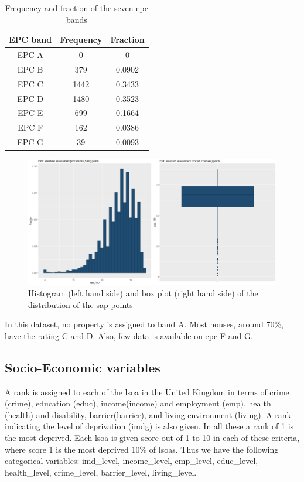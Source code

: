 \documentclass[12pt]{article}
\begin{document}
\begin{table}[H]
\centering
\begin{tabular}{c c c} 
 \hline
 EPC band & Frequency & Fraction \\ [0.5ex] 
 \hline
 EPC A & 0 & 0 \\ 
 EPC B & 379 & 0.0902\\
 EPC C & 1442 & 0.3433 \\
 EPC D & 1480 & 0.3523 \\
 EPC E & 699 & 0.1664 \\
 EPC F & 162 & 0.0386 \\
 EPC G & 39 & 0.0093 \\ [1ex] 
 \hline
\end{tabular}
\caption{Frequency and fraction of the seven \acrshort{epc} bands}
\label{table:EPC}
\end{table}


\begin{figure}[H]
    \centering
    \includegraphics[width=17cm]{epc.png}
    \caption{Histogram (left hand side) and box plot (right hand side) of the distribution of the \acrshort{sap} points}
    \label{fig:EPCs}
\end{figure}

In this dataset, no property is assigned to band A. Most houses, around 70\%, have the rating C and D. Also, few data is available on \acrshort{epc} F and G. 

\subsection{Socio-Economic variables}
A rank is assigned to each of the \acrfull{lsoa} in the United Kingdom in terms of crime (\gls{crime}), education (\gls{educ}), income(\gls{income}) and employment (\gls{emp}), health (\gls{health}) and disability, barrier(\gls{barrier}), and living environment (\gls{living}). A rank indicating the level of deprivation (\gls{imdg}) is also given. In all these a rank of 1 is the most deprived. Each \acrshort{lsoa} is given score out of 1 to 10 in each of these criteria, where score 1 is the most deprived 10\% of \acrshort{lsoa}s. Thus we have the following categorical variables: imd\_level, income\_level, emp\_level, educ\_level, health\_level, crime\_level, barrier\_level, living\_level. 
\end{document}
